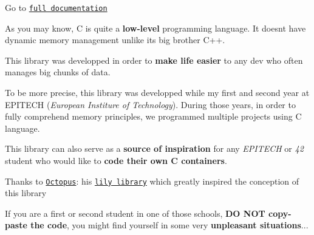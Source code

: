 Go to \href{https://arthi-chaud.github.io/LinkedLists/}{\tt full documentation} 



As you may know, C is quite a {\bfseries low-\/level} programming language. It doesn\textquotesingle{}t have dynamic memory management unlike its big brother C++.

This library was developped in order to {\bfseries make life easier} to any dev who often manages big chunks of data.

To be more precise, this library was developped while my first and second year at E\+P\+I\+T\+E\+CH ({\itshape European Institure of Technology}). During those years, in order to fully comprehend memory principles, we programmed multiple projects using C language.

This library can also serve as a {\bfseries source of inspiration} for any {\itshape E\+P\+I\+T\+E\+CH} or {\itshape 42} student who would like to {\bfseries code their own C containers}.



 

Thanks to \href{https://github.com/Octopus773}{\tt Octopus}\+: his \href{https://github.com/Octopus773/lily}{\tt lily library} which greatly inspired the conception of this library





If you are a first or second student in one of those schools, {\bfseries DO N\+OT copy-\/paste the code}, you might find yourself in some very {\bfseries unpleasant situations}... 